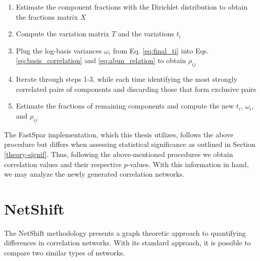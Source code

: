 \begin{enumerate}
\item  Estimate the component fractions with the Dirichlet distribution to obtain the fractions matrix $X$
\item Compute the variation matrix $T$ and the variations $t_i$
\item Plug the log-basis variances $\omega_i$ from Eq. \ref{eq:final_ti} into Eqs. \ref{eq:basis_correlation} and \ref{eq:abun_relation} to obtain $\rho_{ij}$
\item Iterate through steps 1-3, while each time identifying the most strongly correlated pairs of components and discarding those that form exclusive pairs
\item Estimate the fractions of remaining components and compute the new $t_i$, $\omega_i$, and $\rho_{ij}$
\end{enumerate}

The FastSpar implementation, which this thesis utilizes, follows the above procedure but differs when assessing statistical significance as outlined in Section \ref{theory-signif}. Thus, following the above-mentioned procedures we obtain correlation values and their respective $p$-values. With this information in hand, we may analyze the newly generated correlation networks.




\section{NetShift}\label{theory-Netshift}
The NetShift methodology presents a graph theoretic approach to quantifying differences in correlation networks. With its standard approach, it is possible to compare two similar types of networks.   

